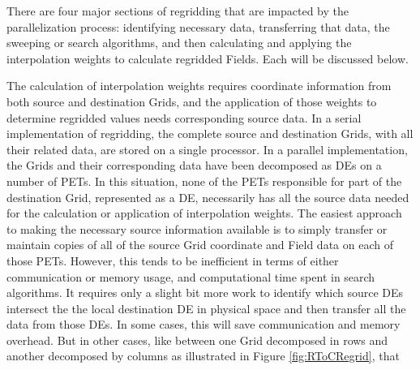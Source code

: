 There are four major sections of regridding that are impacted by the
parallelization process: identifying necessary data, transferring that data, the
sweeping or search algorithms, and then calculating and applying the
interpolation weights to calculate regridded Fields.  Each will be discussed
below.


The calculation of interpolation weights requires coordinate information from
both source and destination Grids, and the application of those weights to
determine regridded values needs corresponding source data.  In a serial
implementation of regridding, the complete source and destination Grids, with
all their related data, are stored on a single processor.  In a parallel
implementation, the Grids and their corresponding data have been decomposed as
DEs on a number of PETs.  In this situation, none of the PETs responsible for
part of the destination Grid, represented as a DE, necessarily has all the source
data needed for the calculation or application of interpolation weights.  The
easiest approach to making the necessary source information available is to
simply transfer or maintain copies of all of the source Grid coordinate and Field
data on each of those PETs.  However, this tends to be inefficient in terms of
either communication or memory usage, and computational time spent in search
algorithms.  It requires only a slight bit more work to identify which source DEs
intersect the the local destination DE in physical space and then transfer all
the data from those DEs.  In some cases, this will save communication and memory
overhead.  But in other cases, like between one Grid decomposed in rows and
another decomposed by columns as illustrated in Figure \ref{fig:RToCRegrid}, that

